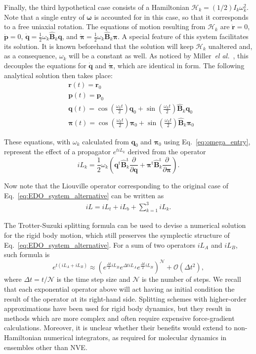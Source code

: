 \documentclass[aip,jcp,reprint,amsmath,amssymb]{revtex4-1}
\newcommand{\mt}[1]{\boldsymbol{\mathbf{#1}}}           %
\newcommand{\vt}[1]{\boldsymbol{\mathbf{#1}}}           %
\newcommand{\tr}[1]{#1^\text{t}}                               %
\newcommand{\diff}[2]{\dfrac{\partial #1}{\partial #2}} %
\begin{document}
Finally, the third hypothetical case consists of a Hamiltonian $\mathcal{H}_k = (1/2) I_k \omega_k^2$. Note that a single entry of $\vt \omega$ is accounted for in this case, so that it corresponds to a free uniaxial rotation. The equations of motion resulting from $\mathcal{H}_k$ are $\dot{\vt r} = 0$, $\dot{\vt p} = 0$, $\dot{\vt q} = \frac{1}{2} \omega_k \hat{\mt B}_k \vt q$, and $\dot{\vt \pi} = \frac{1}{2} \omega_k \hat{\mt B}_k \vt \pi$. A special feature of this system facilitates its solution. It is known beforehand that the solution will keep $\mathcal{H}_k$ unaltered and, as a consequence, $\omega_k$ will be a constant as well. As noticed by Miller~\textit{el al.}~\cite{Miller2002}, this decouples the equations for $\dot{\vt q}$ and $\dot{\vt \pi}$, which are identical in form. The following analytical solution then takes place:\cite{Miller2002}
\begin{align*}
&{\vt r}(t) = {\vt r}_0 \\
&{\vt p}(t) = {\vt p}_0 \\
&{\vt q}(t) = \cos\left(\frac{\omega_k t}{2}\right) \vt q_0 + \sin\left(\frac{\omega_k t}{2}\right) \hat{\mt B}_k \vt q_0 \\
&{\vt \pi}(t) = \cos\left(\frac{\omega_k t}{2}\right) \vt \pi_0 + \sin\left(\frac{\omega_k t}{2}\right) \hat{\mt B}_k \vt \pi_0
\end{align*}

These equations, with $\omega_k$ calculated from $\vt q_0$ and $\vt \pi_0$ using Eq.~\ref{eq:omega_entry}, represent the effect of a propagator $e^{t i\!L_k}$ derived from the operator
\[
i\!L_k = \frac{1}{2} \omega_k \left( \tr{\vt q}\tr{\hat{\mt B}_k} \diff{}{\vt q} + \tr{\vt \pi}\tr{\hat{\mt B}_k} \diff{}{\vt \pi} \right).
\]

Now note that the Liouville operator corresponding to the original case of Eq.~\ref{eq:EDO_system_alternative} can be written as
\begin{align}
\label{eq:full_operator}
i\!L = i\!L_t + i\!L_b + \sum_{k=1}^3 i\!L_k.
\end{align}

The Trotter-Suzuki splitting formula\cite{Trotter1959, Suzuki1976} can be used to devise a numerical solution for the rigid body motion, which still preserves the symplectic structure of Eq.~\ref{eq:EDO_system_alternative}. For a sum of two operators $i\!L_A$ and $i\!L_B$, such formula is
\[
e^{t(i\!L_A + i\!L_B)} \approx \left( e^{\frac{\Delta t}{2} i\!L_B} e^{\Delta t i\!L_A} e^{\frac{\Delta t}{2} i\!L_B} \right)^\mathcal{N} + \mathcal{O}(\Delta t^2),
\]
where $\Delta t = t/\mathcal N$ is the time step size and $\mathcal N$ is the number of steps. We recall that each exponential operator above will act having as initial condition the result of the operator at its right-hand side. Splitting schemes with higher-order approximations have been used for rigid body dynamics,\cite{Omelyan2007, Omelyan2008, vanZon2008} but they result in methods which are more complex and often require expensive force-gradient calculations. Moreover, it is unclear whether their benefits would extend to non-Hamiltonian numerical integrators, as required for molecular dynamics in ensembles other than NVE.
\end{document}
